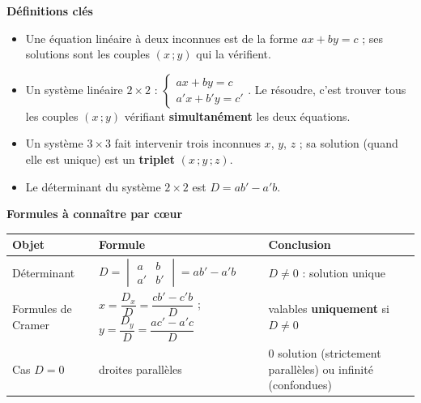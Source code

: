 \documentclass[11pt]{article}
\newcommand{\cle}[1]{{\popxbold\color{popdark}#1}}
\begin{document}
\begin{bilan}
\textbf{Définitions clés}
\begin{itemize}
\item Une \cle{équation linéaire} à deux inconnues est de la forme $ax+by=c$ ; ses solutions sont les couples $(x\,;y)$ qui la vérifient.
\item Un \cle{système linéaire} $2\times 2$ : $\begin{cases} ax+by=c \\ a'x+b'y=c' \end{cases}$. Le résoudre, c'est trouver tous les couples $(x\,;y)$ vérifiant \textbf{simultanément} les deux équations.
\item Un système $3\times 3$ fait intervenir trois inconnues $x$, $y$, $z$ ; sa solution (quand elle est unique) est un \textbf{triplet} $(x\,;y\,;z)$.
\item Le \cle{déterminant} du système $2\times 2$ est $D=ab'-a'b$.
\end{itemize}

\textbf{Formules à connaître par c\oe ur}
\begin{center}
\begin{tabularx}{\linewidth}{|l|X|X|}\hline
\rowcolor{popblueL} \textbf{Objet} & \textbf{Formule} & \textbf{Conclusion} \\ \hline
Déterminant & $D=\begin{vmatrix} a & b \\ a' & b' \end{vmatrix}=ab'-a'b$ & $D\neq 0$ : solution unique \\ \hline
Formules de Cramer & $x=\dfrac{D_x}{D}=\dfrac{cb'-c'b}{D}$ ; \quad $y=\dfrac{D_y}{D}=\dfrac{ac'-a'c}{D}$ & valables \textbf{uniquement} si $D\neq 0$ \\ \hline
Cas $D=0$ & droites parallèles & $0$ solution (strictement parallèles) ou infinité (confondues) \\ \hline
\end{tabularx}
\end{center}


\end{bilan}
\end{document}
